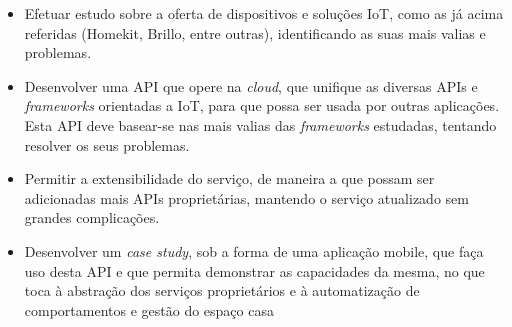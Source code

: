 \begin{itemize}
\item Efetuar estudo sobre a oferta de dispositivos e soluções IoT, como as já acima referidas (Homekit, Brillo, entre outras), identificando as suas mais valias e problemas.

\item Desenvolver uma API que opere na \textit{cloud}, que unifique as diversas APIs e \textit{frameworks} orientadas a IoT, para que possa ser usada por outras aplicações. Esta API deve basear-se nas mais valias das \textit{frameworks} estudadas, tentando resolver os seus problemas.

\item Permitir a extensibilidade do serviço, de maneira a que possam ser adicionadas mais APIs proprietárias, mantendo o serviço atualizado sem grandes complicações.

\item Desenvolver um \textit{case study}, sob a forma de uma aplicação mobile, que faça uso desta API e que permita demonstrar as capacidades da mesma, no que toca à abstração dos serviços proprietários e à automatização de comportamentos e gestão do espaço casa
\end{itemize}

